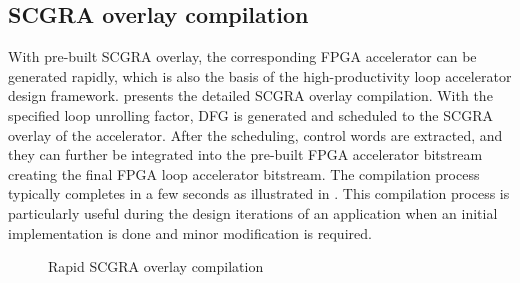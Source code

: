 \subsection{SCGRA overlay compilation}
With pre-built SCGRA overlay, the corresponding FPGA accelerator can be generated rapidly, which
is also the basis of the high-productivity loop accelerator design framework.
 presents the detailed SCGRA overlay compilation. 
With the specified loop unrolling factor, DFG is generated and scheduled to the SCGRA overlay of the accelerator. 
After the scheduling, control words are extracted, and they can 
further be integrated into the pre-built FPGA accelerator bitstream creating 
the final FPGA loop accelerator bitstream. The compilation process typically completes in a few
seconds as illustrated in \cite{scgra}. This compilation process is particularly useful during the
design iterations of an application when an initial implementation is done and minor modification is
required. 

\begin{figure}[tb]
\caption{Rapid SCGRA overlay compilation}
\label{fig:detailed-compilation}
\end{figure}


